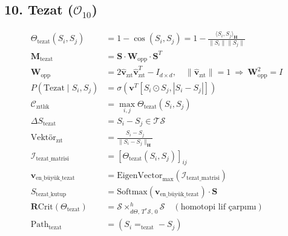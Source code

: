 \documentclass[11pt, a4paper]{article}
\begin{document}
\subsection{10. Tezat ($\mathcal{O}_{10}$)}
\begin{align}
\Theta_{\text{tezat}}(S_i, S_j) &= 1 - \cos(S_i, S_j) = 1 - \frac{\langle S_i, S_j \rangle_{\mathbf{H}}}{\|S_i\| \|S_j\|} \\
\mathbf{M}_{\text{tezat}} &= \mathbf{S} \cdot \mathbf{W}_{\text{opp}} \cdot \mathbf{S}^T \\
\mathbf{W}_{\text{opp}} &= 2\hat{\mathbf{v}}_{\text{zıt}} \hat{\mathbf{v}}_{\text{zıt}}^T - I_{d \times d}, \quad \|\hat{\mathbf{v}}_{\text{zıt}}\| = 1 \ \Rightarrow \ \mathbf{W}_{\text{opp}}^2 = I \\
P(\text{Tezat} \mid S_i, S_j) &= \sigma\left( \mathbf{v}^T [S_i \odot S_j, |S_i - S_j|] \right) \\
\mathcal{C}_{\text{zıtlık}} &= \max_{i,j} \Theta_{\text{tezat}}(S_i, S_j) \\
\Delta S_{\text{tezat}} &= S_i - S_j \in \mathcal{T}\mathcal{S} \\
\text{Vektör}_{\text{zıt}} &= \frac{S_i - S_j}{\|S_i - S_j\|_{\mathbf{H}}} \\
\mathcal{I}_{\text{tezat\_matrisi}} &= \left[ \Theta_{\text{tezat}}(S_i, S_j) \right]_{ij} \\
\mathbf{v}_{\text{en\_büyük\_tezat}} &= \text{EigenVector}_{\max}(\mathcal{I}_{\text{tezat\_matrisi}}) \\
S_{\text{tezat\_kutup}} &= \text{Softmax}(\mathbf{v}_{\text{en\_büyük\_tezat}}) \cdot \mathbf{S} \\
\mathbf{R}\text{Crit}(\Theta_{\text{tezat}}) &= \mathcal{S} \times^{h}_{d\Theta, \, T^*\mathcal{S}, \, 0} \mathcal{S} \quad (\text{homotopi lif çarpımı}) \\
\text{Path}_{\text{tezat}} &= (S_i =_{\text{tezat}} -S_j)
\end{align}
\end{document}
